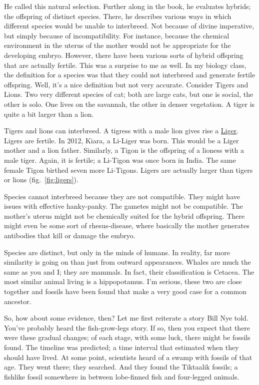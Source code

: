 \begin{multicols}{2}
He called this natural selection. Further along in the book, he evaluates hybrids; the offspring of distinct species. There, he describes various ways in which different species would be unable to interbreed. Not because of divine imperative, but simply because of incompatibility. For instance, because the chemical environment in the uterus of the mother would not be appropriate for the developing embryo. However, there have been various sorts of hybrid offspring that are actually fertile. This was a surprise to me as well. In my biology class, the definition for a species was that they could not interbreed and generate fertile offspring. Well, it's a nice definition but not very accurate. Consider Tigers and Lions. Two very different species of cat; both are large cats, but one is social, the other is solo. One lives on the savannah, the other in denser vegetation. A tiger is quite a bit larger than a lion.

Tigers and lions can interbreed. A tigress with a male lion gives rise a \href{https://en.wikipedia.org/wiki/Liger}{Liger}. Ligers are fertile. In 2012, Kiara, a Li-Liger was born. This would be a Liger mother and a lion father. Similarly, a Tigon is the offspring of a lioness with a male tiger. Again, it is fertile; a Li-Tigon was once born in India. The same female Tigon birthed seven more Li-Tigons. Ligers are actually larger than tigers or lions (fig.~\ref{fig:ligers}).


Species cannot interbreed because they are not compatible. They might have issues with effective hanky-panky. The gametes might not be compatible. The mother's uterus might not be chemically suited for the hybrid offspring. There might even be some sort of rhesus-disease, where basically the mother generates antibodies that kill or damage the embryo.

Species are distinct, but only in the minds of humans. In reality, far more similarity is going on than just from outward appearances. Whales are much the same as you and I; they are mammals. In fact, their classification is Cetacea. The most similar animal living is a hippopotamus. I'm serious, these two are close together and fossils have been found that make a very good case for a common ancestor.

So, how about some evidence, then? Let me first reiterate a story Bill Nye told. You've probably heard the fish-grow-legs story. If so, then you expect that there were these gradual changes; of each stage, with some luck, there might be fossils found. The timeline was predicted; a time interval that estimated when they should have lived. At some point, scientists heard of a swamp with fossils of that age. They went there; they searched. And they found the Tiktaalik fossils; a fishlike fossil somewhere in between lobe-finned fish and four-legged animals.


\end{multicols}
